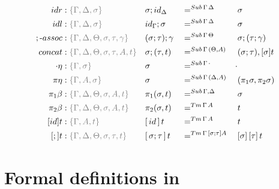\documentclass[a4paper,UKenglish,numberwithinsect,cleveref,thm-restate]{lipics-v2021}
\begin{document}
\begin{alignat*}{5}
  \mathsf{idr}    & : \implicit{\Gamma, \Delta, \sigma} && {\sigma ; \idS_{\Delta}} && =^{\Sub\,\Gamma\,\Delta} && {\sigma} \\
  \mathsf{idl}    & : \implicit{\Gamma, \Delta, \sigma} && {\idS_{\Gamma} ; \sigma} && =^{\Sub\,\Gamma\,\Delta} && {\sigma} \\
  ;\text{-}\mathsf{assoc} & : \implicit{\Gamma, \Delta, \Theta, \sigma, \tau, \gamma} && (\sigma ; \tau) ; \gamma && =^{\Sub\,\Gamma\,\Theta} &&  \sigma ; (\tau ; \gamma) \\
  \mathsf{concat} & : \implicit{\Gamma, \Delta, \Theta, \sigma, \tau, A, t} &&\sigma ; (\tau , t)      && =^{\Sub\,\Gamma\,(\Theta, A)} &&  (\sigma ; \tau) , [ \sigma ] t \\
  \emptyctx\eta   & : \implicit{\Gamma, \sigma} && \sigma                   && =^{\Sub\,\Gamma\,\emptyctx} & \emptysub \\
  \pi\eta         & : \implicit{\Gamma, A, \sigma} && \sigma                   && =^{\Sub\,\Gamma\,(\Delta, A)} &&  (\pi_1 \sigma, \pi_2 \sigma) \\
  \pi_1\beta      & : \implicit{\Gamma, \Delta, \Theta, \sigma, A, t} && \pi_1(\sigma , t)        && =^{\Sub\,\Gamma,\Delta} &&  \sigma \\
  \pi_2\beta      & : \implicit{\Gamma, \Delta, \Theta, \sigma, A, t} && \pi_2(\sigma , t)        && =^{\Tm\,\Gamma\, A} &&  t \\
  [\idS]t         & : \implicit{\Gamma, A, t} && {[\,\idS\,]\,t}          && =^{\Tm\,\Gamma\,A} && t \\
  [;]t            & :\implicit{\Gamma, \Delta, \Theta, \sigma, \tau, t} && {[\,\sigma ; \tau\,]\,t} && =^{\Tm\,\Gamma\,[\sigma ; \tau] A} && {[ \sigma ]\,[ \tau ]\,t} \\
\end{alignat*}

\section{Formal definitions in \Agda}
\end{document}
